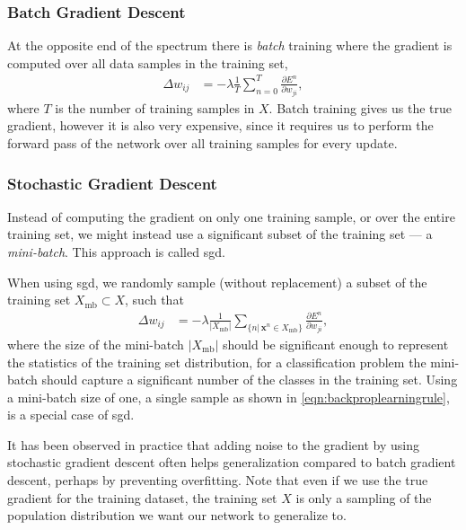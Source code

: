 \documentclass[thesis]{subfiles}
\begin{document}
\subsubsection{Batch Gradient Descent}
At the opposite end of the spectrum there is \emph{batch} training where the gradient is computed over all data samples in the training set,
\begin{equation}
\begin{aligned}
    \Delta w_{ij} &= -\lambda\frac{1}{T} \sum^T_{n=0} \frac{\partial E^n}{\partial w_{ji}},
     \label{eqn:batchlearningrule}
\end{aligned}
\end{equation}
%
where $T$ is the number of training samples in $X$. Batch training gives us the true gradient, however it is also very expensive, since it requires us to perform the forward pass of the network over all training samples for every update. 

\subsubsection{Stochastic Gradient Descent}
Instead of computing the gradient on only one training sample, or over the entire training set, we might instead use a significant subset of the training set --- a \emph{mini-batch}. This approach is called \gls{sgd}.

When using \gls{sgd}, we randomly sample (without replacement) a subset of the training set $X_{\textrm{mb}} \subset X$, such that
\begin{equation}
\begin{aligned}
    \Delta w_{ij} &= -\lambda \frac{1}{|X_{\textrm{mb}}|} \sum_{\{n|\,\mathbf{x}^n \in X_{\textrm{mb}}\}} \frac{\partial E^n}{\partial w_{ji}},
     \label{eqn:sgdrule}
\end{aligned}
\end{equation}
where the size of the mini-batch $|X_{\textrm{mb}}|$ should be significant enough to represent the statistics of the training set distribution, \ie for a classification problem the mini-batch should capture a significant number of the classes in the training set. Using a mini-batch size of one, \ie a single sample as shown in \cref{eqn:backproplearningrule}, is a special case of \gls{sgd}. 

It has been observed in practice that adding noise to the gradient by using stochastic gradient descent often helps generalization compared to batch gradient descent, perhaps by preventing overfitting. Note that even if we use the true gradient for the training dataset, the training set $X$ is only a sampling of the population distribution we want our network to generalize to.
\end{document}
